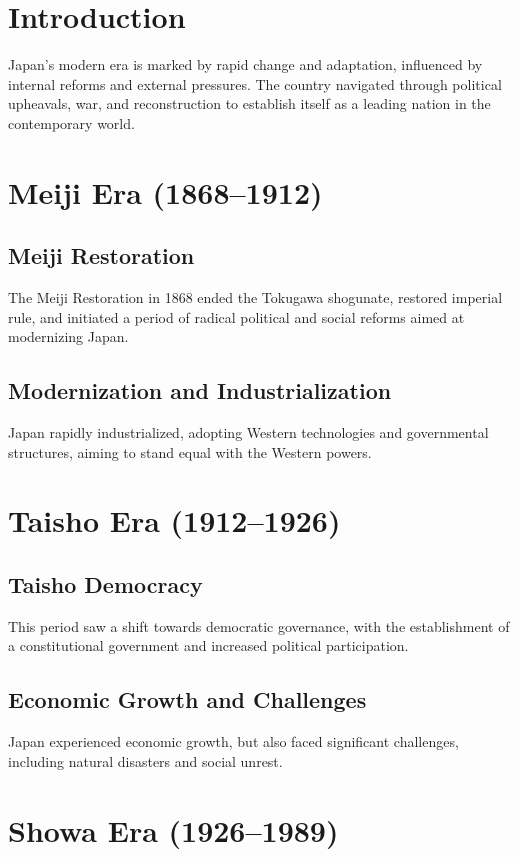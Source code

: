 \documentclass[a4paper,12pt]{book}
\begin{document}
\section{Introduction}
\label{sec:introduction-modern-japan}
Japan’s modern era is marked by rapid change and adaptation, influenced by internal reforms and external pressures. The country navigated through political upheavals, war, and reconstruction to establish itself as a leading nation in the contemporary world.

\section{Meiji Era (1868–1912)}
\label{sec:meiji-era}
\subsection{Meiji Restoration}
The Meiji Restoration in 1868 ended the Tokugawa shogunate, restored imperial rule, and initiated a period of radical political and social reforms aimed at modernizing Japan.

\subsection{Modernization and Industrialization}
Japan rapidly industrialized, adopting Western technologies and governmental structures, aiming to stand equal with the Western powers.

\section{Taisho Era (1912–1926)}
\label{sec:taisho-era}
\subsection{Taisho Democracy}
This period saw a shift towards democratic governance, with the establishment of a constitutional government and increased political participation.

\subsection{Economic Growth and Challenges}
Japan experienced economic growth, but also faced significant challenges, including natural disasters and social unrest.

\section{Showa Era (1926–1989)}
\label{sec:showa-era}
\end{document}
